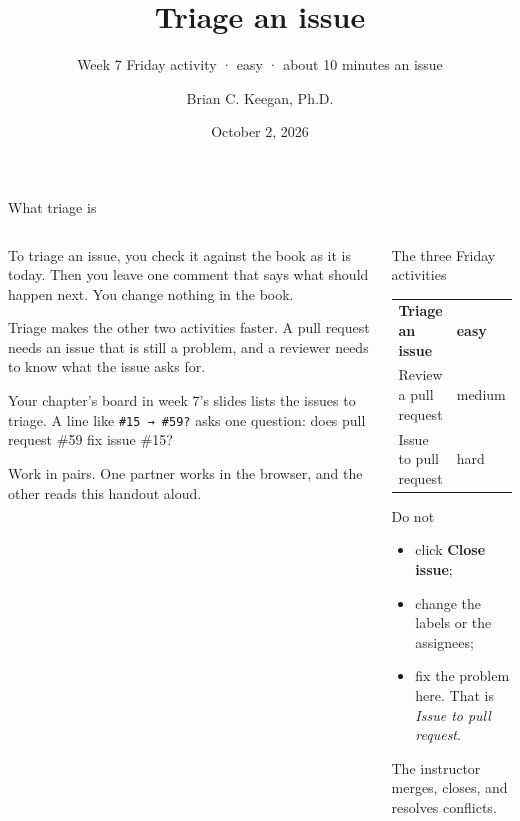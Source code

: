 \documentclass{handout}
\title[INFO 4617 · Week 7 · Friday activities · Triage an issue]{Triage an issue}
\subtitle{Week 7 Friday activity · easy · about 10 minutes an issue}
\author{Brian C. Keegan, Ph.D.}
\institute{Department of Information Science, University of Colorado Boulder}
\date{October 2, 2026}
\begin{document}
\maketitle

\begin{frame}{What triage is}
  \begin{columns}[T]
    \begin{column}{0.57\textwidth}
      To triage an issue, you check it against the book as it is today. Then
      you leave one comment that says what should happen next. You change
      nothing in the book.

      Triage makes the other two activities faster. A pull request needs an
      issue that is still a problem, and a reviewer needs to know what the
      issue asks for.

      Your chapter's board in week 7's slides lists the issues to triage. A
      line like \texttt{\#15 → \#59?} asks one question: does pull request
      \#59 fix issue \#15?

      Work in pairs. One partner works in the browser, and the other reads
      this handout aloud.
    \end{column}
    \begin{column}{0.39\textwidth}
      \begin{block}{The three Friday activities}
        \small
        \begin{tabular}{@{}ll@{}}
          \textbf{Triage an issue} & \textbf{easy}\\
          Review a pull request & medium\\
          Issue to pull request & hard
        \end{tabular}
      \end{block}
      \begin{alertblock}{Do not}
        \small
        \begin{itemize}
          \item click \textbf{Close issue};
          \item change the labels or the assignees;
          \item fix the problem here. That is \textit{Issue to pull request}.
        \end{itemize}
        The instructor merges, closes, and resolves conflicts.
      \end{alertblock}
    \end{column}
  \end{columns}
\end{frame}
\end{document}
